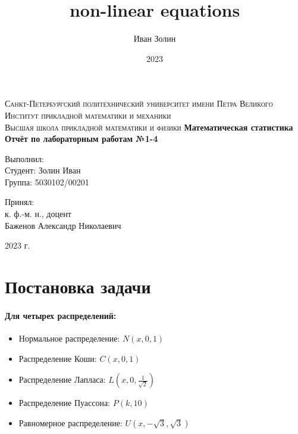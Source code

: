 \documentclass[a4paper,14pt]{article}
\title{non-linear equations}
\author{Иван Золин}
\date{2023}
\begin{document}
	
	\begin{titlepage}
		\begin{center}
			\textsc{
				Санкт-Петербургский политехнический университет имени Петра Великого \\[5mm]
				Институт прикладной математики и механики\\[2mm]
				Высшая школа прикладной математики и физики            
			}   
			\vfill
			\textbf{\large
				Математическая статистика\\
				Отчёт по лабораторным работам №1-4 \\[3mm]
			}                
		\end{center}
		
		\vfill
		\hfill
		\begin{minipage}{0.5\textwidth}
			Выполнил: \\[2mm]   
			Студент: Золин Иван \\
			Группа: 5030102/00201\\
		\end{minipage}
		
		\hfill
		\begin{minipage}{0.5\textwidth}
			Принял: \\[2mm]
			к. ф.-м. н., доцент \\   
			Баженов Александр Николаевич
		\end{minipage}
		
		\vfill
		\begin{center}
			2023 г.
		\end{center}
	\end{titlepage}
	
	\tableofcontents
	\newpage
	\listoffigures
	\newpage
	\listoftables
	\newpage
	
	\section{Постановка задачи}
	\paragraph{Для четырех распределений:}
	\begin{itemize}
		\item Нормальное распределение: $N(x, 0, 1)$
		\item Распределение Коши: $C(x, 0, 1)$
		\item Распределение Лапласа: $L(x, 0, \frac{1}{\sqrt{2}})$
		\item Распределение Пуассона: $P(k, 10)$
		\item Равномерное распределение: $U(x, -\sqrt{3}, \sqrt{3})$
	\end{itemize}
\end{document}

